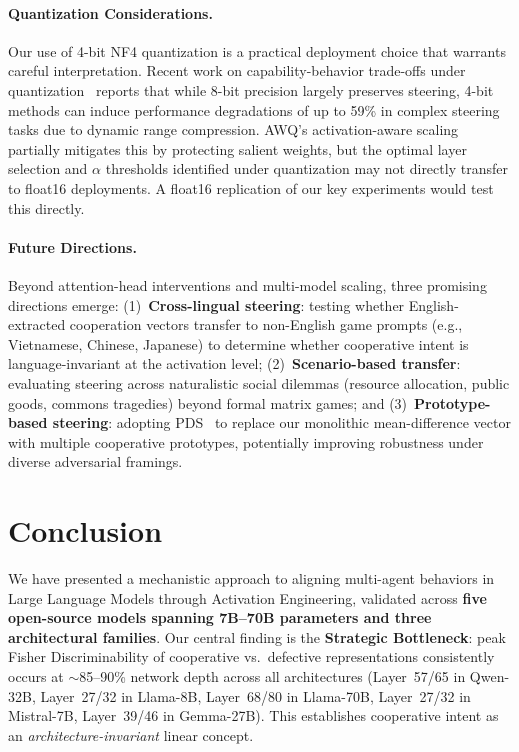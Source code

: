 \documentclass{article}
\begin{document}
\paragraph{Quantization Considerations.}
Our use of 4-bit NF4 quantization is a practical deployment choice that warrants careful interpretation. Recent work on capability-behavior trade-offs under quantization~\citep{sprejer2026gap} reports that while 8-bit precision largely preserves steering, 4-bit methods can induce performance degradations of up to 59\% in complex steering tasks due to dynamic range compression. AWQ's activation-aware scaling partially mitigates this by protecting salient weights, but the optimal layer selection and $\alpha$ thresholds identified under quantization may not directly transfer to float16 deployments. A float16 replication of our key experiments would test this directly.

\paragraph{Future Directions.}
Beyond attention-head interventions and multi-model scaling, three promising directions emerge: (1)~\textbf{Cross-lingual steering}: testing whether English-extracted cooperation vectors transfer to non-English game prompts (e.g., Vietnamese, Chinese, Japanese) to determine whether cooperative intent is language-invariant at the activation level; (2)~\textbf{Scenario-based transfer}: evaluating steering across naturalistic social dilemmas (resource allocation, public goods, commons tragedies) beyond formal matrix games; and (3)~\textbf{Prototype-based steering}: adopting PDS~\citep{kayan2025pds} to replace our monolithic mean-difference vector with multiple cooperative prototypes, potentially improving robustness under diverse adversarial framings.


\section{Conclusion}
\label{sec:conclusion}

We have presented a mechanistic approach to aligning multi-agent behaviors in Large Language Models through Activation Engineering, validated across \textbf{five open-source models spanning 7B--70B parameters and three architectural families}. Our central finding is the \textbf{Strategic Bottleneck}: peak Fisher Discriminability of cooperative vs.\ defective representations consistently occurs at $\sim$85--90\% network depth across all architectures (Layer~57/65 in Qwen-32B, Layer~27/32 in Llama-8B, Layer~68/80 in Llama-70B, Layer~27/32 in Mistral-7B, Layer~39/46 in Gemma-27B). This establishes cooperative intent as an \textit{architecture-invariant} linear concept.
\end{document}

